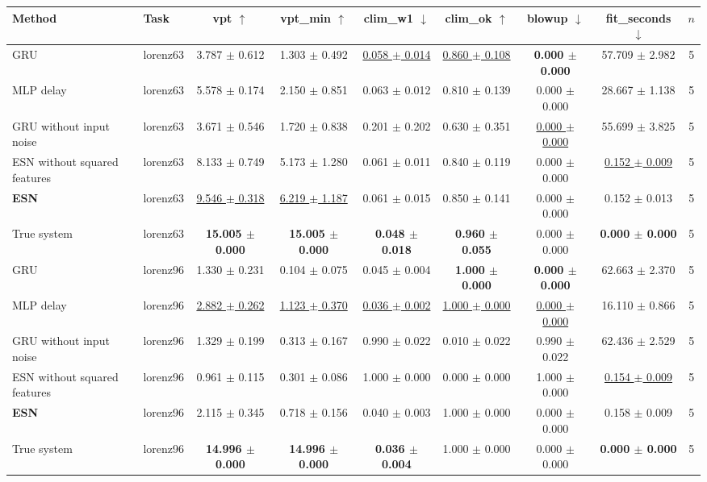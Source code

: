 \begin{tabular}{llccccccc}
\toprule
Method & Task & vpt $\uparrow$ & vpt\_min $\uparrow$ & clim\_w1 $\downarrow$ & clim\_ok $\uparrow$ & blowup $\downarrow$ & fit\_seconds $\downarrow$ & $n$ \\
\midrule
GRU & lorenz63 & 3.787 $\pm$ 0.612 & 1.303 $\pm$ 0.492 & \underline{0.058 $\pm$ 0.014} & \underline{0.860 $\pm$ 0.108} & \textbf{0.000 $\pm$ 0.000} & 57.709 $\pm$ 2.982 & 5 \\
MLP delay & lorenz63 & 5.578 $\pm$ 0.174 & 2.150 $\pm$ 0.851 & 0.063 $\pm$ 0.012 & 0.810 $\pm$ 0.139 & 0.000 $\pm$ 0.000 & 28.667 $\pm$ 1.138 & 5 \\
GRU without input noise & lorenz63 & 3.671 $\pm$ 0.546 & 1.720 $\pm$ 0.838 & 0.201 $\pm$ 0.202 & 0.630 $\pm$ 0.351 & \underline{0.000 $\pm$ 0.000} & 55.699 $\pm$ 3.825 & 5 \\
ESN without squared features & lorenz63 & 8.133 $\pm$ 0.749 & 5.173 $\pm$ 1.280 & 0.061 $\pm$ 0.011 & 0.840 $\pm$ 0.119 & 0.000 $\pm$ 0.000 & \underline{0.152 $\pm$ 0.009} & 5 \\
\textbf{ESN} & lorenz63 & \underline{9.546 $\pm$ 0.318} & \underline{6.219 $\pm$ 1.187} & 0.061 $\pm$ 0.015 & 0.850 $\pm$ 0.141 & 0.000 $\pm$ 0.000 & 0.152 $\pm$ 0.013 & 5 \\
True system & lorenz63 & \textbf{15.005 $\pm$ 0.000} & \textbf{15.005 $\pm$ 0.000} & \textbf{0.048 $\pm$ 0.018} & \textbf{0.960 $\pm$ 0.055} & 0.000 $\pm$ 0.000 & \textbf{0.000 $\pm$ 0.000} & 5 \\
\midrule
GRU & lorenz96 & 1.330 $\pm$ 0.231 & 0.104 $\pm$ 0.075 & 0.045 $\pm$ 0.004 & \textbf{1.000 $\pm$ 0.000} & \textbf{0.000 $\pm$ 0.000} & 62.663 $\pm$ 2.370 & 5 \\
MLP delay & lorenz96 & \underline{2.882 $\pm$ 0.262} & \underline{1.123 $\pm$ 0.370} & \underline{0.036 $\pm$ 0.002} & \underline{1.000 $\pm$ 0.000} & \underline{0.000 $\pm$ 0.000} & 16.110 $\pm$ 0.866 & 5 \\
GRU without input noise & lorenz96 & 1.329 $\pm$ 0.199 & 0.313 $\pm$ 0.167 & 0.990 $\pm$ 0.022 & 0.010 $\pm$ 0.022 & 0.990 $\pm$ 0.022 & 62.436 $\pm$ 2.529 & 5 \\
ESN without squared features & lorenz96 & 0.961 $\pm$ 0.115 & 0.301 $\pm$ 0.086 & 1.000 $\pm$ 0.000 & 0.000 $\pm$ 0.000 & 1.000 $\pm$ 0.000 & \underline{0.154 $\pm$ 0.009} & 5 \\
\textbf{ESN} & lorenz96 & 2.115 $\pm$ 0.345 & 0.718 $\pm$ 0.156 & 0.040 $\pm$ 0.003 & 1.000 $\pm$ 0.000 & 0.000 $\pm$ 0.000 & 0.158 $\pm$ 0.009 & 5 \\
True system & lorenz96 & \textbf{14.996 $\pm$ 0.000} & \textbf{14.996 $\pm$ 0.000} & \textbf{0.036 $\pm$ 0.004} & 1.000 $\pm$ 0.000 & 0.000 $\pm$ 0.000 & \textbf{0.000 $\pm$ 0.000} & 5 \\
\bottomrule
\end{tabular}

